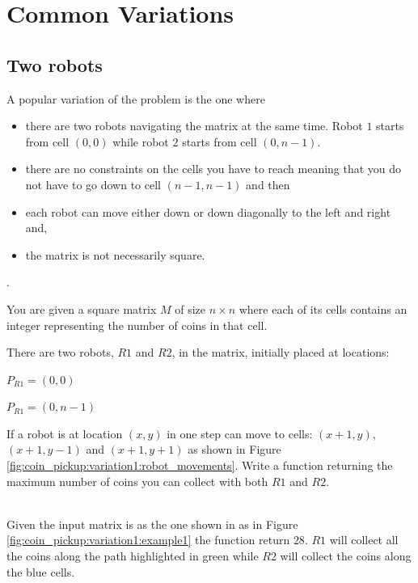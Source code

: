 \section{Common Variations}
\subsection{Two robots}
A popular variation of the \textit{	} problem is the one where
\begin{itemize}
	\item there are two robots navigating the matrix at the same time. 
	Robot $1$ starts from cell $(0,0)$ while robot $2$ starts from cell $(0,n-1)$.
	\item there are no constraints on the cells you have to reach meaning that you 
	do not have to go down to cell $(n-1,n-1)$ and then 
	\item each robot can move either down or down diagonally to the left and right and,
	\item the matrix is not necessarily square.
\end{itemize}.

\begin{exercise}
	\label{example:coin_pickup:variation1:exercice1}
	You are given a square matrix $M$ of size $n \times n$ where each of its cells contains an integer
	representing the number of coins in that cell. 
	
	There are two robots, $R1$ and $R2$, in the matrix, initially placed at locations: 
	\begin{enumerate*}
		\item $P_{R1}=(0,0)$
		\item $P_{R1}=(0,n-1)$
	\end{enumerate*}
	If a robot is at location $(x,y)$ in one step can move to cells: $(x+1,y)$, $(x+1,y-1)$ and $(x+1,y+1)$ as shown in Figure \ref{fig:coin_pickup:variation1:robot_movements}.
	Write a function returning the maximum number of coins you can collect with both $R1$ and $R2$.	
	
	
	\begin{example}
			\label{example:coin_pickup:variation1::example1}
			\hfill \\
			Given the input matrix is as the one shown in as in Figure \ref{fig:coin_pickup:variation1:example1} the function return $28$.
			$R1$ will collect all the coins along the path highlighted in green while $R2$ will collect the coins along the blue cells.
		\end{example}
	
\end{exercise}

